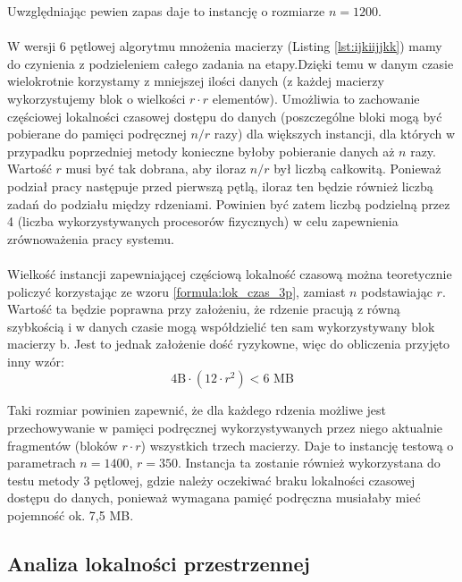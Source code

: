 \documentclass[12pt,a4paper]{article}
\begin{document}
Uwzględniając pewien zapas daje to instancję o rozmiarze $n=1200$.\\
\\

W wersji 6 pętlowej algorytmu mnożenia macierzy (Listing \ref{lst:ijkiijjkk}) mamy do czynienia z podzieleniem całego zadania na etapy.Dzięki temu w danym czasie wielokrotnie korzystamy z mniejszej ilości danych (z każdej macierzy wykorzystujemy blok o wielkości $r \cdot r$ elementów). Umożliwia to zachowanie częściowej lokalności czasowej dostępu do danych (poszczególne bloki mogą być pobierane do pamięci podręcznej $n / r$ razy) dla większych instancji, dla których w przypadku poprzedniej metody konieczne byłoby pobieranie danych aż $n$ razy. Wartość $r$ musi być tak dobrana, aby iloraz $n/r$ był liczbą całkowitą. Ponieważ podział pracy następuje przed pierwszą pętlą, iloraz ten będzie również liczbą zadań do podziału między rdzeniami. Powinien być zatem liczbą podzielną przez 4 (liczba wykorzystywanych procesorów fizycznych) w celu zapewnienia zrównoważenia pracy systemu.\\
\\
Wielkość instancji zapewniającej częściową lokalność czasową można teoretycznie policzyć korzystając ze wzoru \ref{formula:lok_czas_3p}, zamiast $n$ podstawiając $r$. Wartość ta będzie poprawna przy założeniu, że rdzenie pracują z równą szybkością i w danych czasie mogą współdzielić ten sam wykorzystywany blok macierzy b. Jest to jednak założenie dość ryzykowne, więc do obliczenia przyjęto inny wzór: 
\begin{equation} \label{formula:lok_czas_6p}
4\text{B} \cdot \left( 12 \cdot r^2 \right) < 6 \text{ MB}
\end{equation}

Taki rozmiar powinien zapewnić, że dla każdego rdzenia możliwe jest przechowywanie w pamięci podręcznej wykorzystywanych przez niego aktualnie fragmentów (bloków $r \cdot r$) wszystkich trzech macierzy. Daje to instancję testową o parametrach $n=1400$, $r=350$. Instancja ta zostanie również wykorzystana do testu metody 3 pętlowej, gdzie należy oczekiwać braku lokalności czasowej dostępu do danych, ponieważ wymagana pamięć podręczna musiałaby mieć pojemność ok. 7,5 MB.


\subsection{Analiza lokalności przestrzennej}
\end{document}
